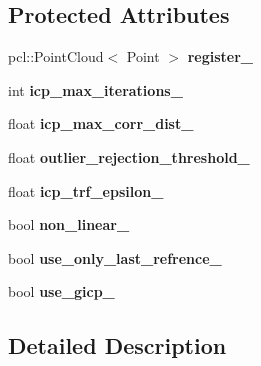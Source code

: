 \subsection*{Protected Attributes}
\begin{DoxyCompactItemize}
\item 
\hypertarget{classRegistration__ICP_a20abdf17fe5018793562e5ee6846d21f}{
pcl::PointCloud$<$ Point $>$ {\bfseries register\_\-}}
\label{classRegistration__ICP_a20abdf17fe5018793562e5ee6846d21f}

\item 
\hypertarget{classRegistration__ICP_a5e42b414fed6c9819ee9f32c823ec1ae}{
int {\bfseries icp\_\-max\_\-iterations\_\-}}
\label{classRegistration__ICP_a5e42b414fed6c9819ee9f32c823ec1ae}

\item 
\hypertarget{classRegistration__ICP_aca82c8a16a506d961391953d066a2fe4}{
float {\bfseries icp\_\-max\_\-corr\_\-dist\_\-}}
\label{classRegistration__ICP_aca82c8a16a506d961391953d066a2fe4}

\item 
\hypertarget{classRegistration__ICP_a8f16700511ebd07a622729917f12d8c9}{
float {\bfseries outlier\_\-rejection\_\-threshold\_\-}}
\label{classRegistration__ICP_a8f16700511ebd07a622729917f12d8c9}

\item 
\hypertarget{classRegistration__ICP_ad7e975482bc81a2c49fa82b7d29758d8}{
float {\bfseries icp\_\-trf\_\-epsilon\_\-}}
\label{classRegistration__ICP_ad7e975482bc81a2c49fa82b7d29758d8}

\item 
\hypertarget{classRegistration__ICP_a09bf9b060c676380761a75cc7831f642}{
bool {\bfseries non\_\-linear\_\-}}
\label{classRegistration__ICP_a09bf9b060c676380761a75cc7831f642}

\item 
\hypertarget{classRegistration__ICP_af46d619b7417a00a925b3557ea3e771d}{
bool {\bfseries use\_\-only\_\-last\_\-refrence\_\-}}
\label{classRegistration__ICP_af46d619b7417a00a925b3557ea3e771d}

\item 
\hypertarget{classRegistration__ICP_ab471192a1045e731608aead65acdffad}{
bool {\bfseries use\_\-gicp\_\-}}
\label{classRegistration__ICP_ab471192a1045e731608aead65acdffad}

\end{DoxyCompactItemize}


\subsection{Detailed Description}
